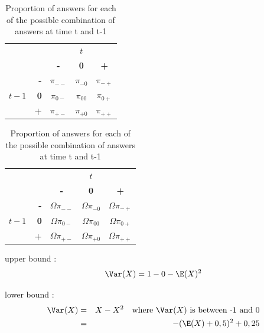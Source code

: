 \documentclass{article}[]
\begin{document}
\begin{table}[H]
    \centering
    \begin{tabular}{r | r | c c c | }
    \multicolumn{1}{r}{} & \multicolumn{1}{r}{} &    \multicolumn{3}{c}{$t$} \\ \cline{3-5}
    \multicolumn{1}{r}{} &         & \textbf{-} & \textbf{0} & \textbf{+} \\ \cline{2-5}
            &    \textbf{-} & $\pi_{--}$    & $\pi_{-0}$    & $\pi_{-+}$ \\ 
    $t-1$ & \textbf{0} & $\pi_{0-}$    & $\pi_{00}$    & $\pi_{0+}$    \\
            &    \textbf{+} & $\pi_{+-}$    & $\pi_{+0}$    & $\pi_{++}$ \\ \cline{2-5}
    \end{tabular}    
    \caption{Proportion of answers for each of the possible combination of answers at time t and t-1}
    \label{tab:EIR proportions}
\end{table}



\begin{table}[H]
    \centering
    \begin{tabular}{r | r | c c c | }
    \multicolumn{1}{r}{} & \multicolumn{1}{r}{} &	\multicolumn{3}{c}{$t$} \\ \cline{3-5}
    \multicolumn{1}{r}{} & 		& \textbf{-} & \textbf{0} & \textbf{+} \\ \cline{2-5}
    		&    \textbf{-} & $\Omega \pi_{--}$	& $\Omega \pi_{-0}$	& $\Omega \pi_{-+}$ \\ 
    $t-1$ & \textbf{0} & $\Omega \pi_{0-}$	& $\Omega \pi_{00}$	& $\Omega \pi_{0+}$	\\
    		&    \textbf{+} & $\Omega \pi_{+-}$	& $\Omega \pi_{+0}$	& $\Omega \pi_{++}$ \\ \cline{2-5}
    \end{tabular}    
    \caption{Proportion of answers for each of the possible combination of answers at time t and t-1}
    \label{tab:EIR proportions weighted}
\end{table}


upper bound : 
\begin{equation}
    \Var(X) = 1 - 0 - \E(X)^2
\end{equation}

lower bound : 
\begin{eqnarray}
\Var(X) &=& X - X^2 \quad \text{where } \Var(X) \text{ is between -1 and 0} \\
    &=& - (\E(X) + 0,5)^2 + 0,25 
\end{eqnarray}
\end{document}

